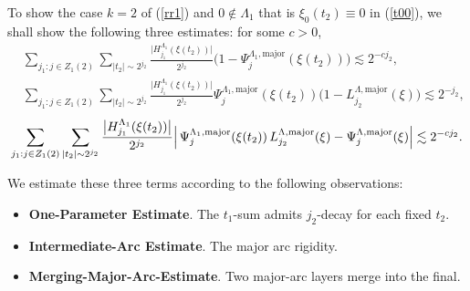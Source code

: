 \documentclass[10pt,a4paper]{amsart}
\numberwithin{equation}{section}
\begin{document}
 

To show the case $k=2$ of (\ref{rr1}) and $0\notin \Lambda_1$  that is $\xi_0(t_2)\equiv 0$ in (\ref{t00}), 
 we shall show  the following three estimates: for some $c>0$,
\begin{align}
&\sum_{j_1 : j \in Z_1(2)} 
  \sum_{|t_2|\sim 2^{j_2}}
  \frac{\bigl|H^{\Lambda_1}_{j_1}(\xi(t_2))\bigr|}{2^{j_2}}
  \bigl(1 - \Psi_{j}^{\Lambda_1,\mathrm{major}}(\xi(t_2))\bigr)\lesssim 2^{-c j_2}, 
  \label{283a} \\
&\sum_{j_1 : j \in Z_1(2)} 
  \sum_{|t_2|\sim 2^{j_2}}
  \frac{\bigl|H^{\Lambda_1}_{j_1}(\xi(t_2))\bigr|}{2^{j_2}}
  \Psi_{j}^{\Lambda_1,\mathrm{major}}\!\left(\xi(t_2)\right)
  \bigl(1 - L^{\Lambda,\mathrm{major}}_{j_2}(\xi)\bigr)\lesssim 2^{-j_2},\label{283b}
\end{align}
\begin{equation}
	\sum_{j_1 : j \in Z_1(2)} 
	\sum_{|t_2|\sim 2^{j_2}}
	\frac{\bigl|H^{\Lambda_1}_{j_1}(\xi(t_2))\bigr|}{2^{j_2}} 
	\Bigl|\,
	\Psi_j^{\Lambda_1,\mathrm{major}}\!\left(\xi(t_2)\right)
	L^{\Lambda,\mathrm{major}}_{j_2}(\xi)
	- \Psi_j^{\Lambda,\mathrm{major}}(\xi)
	\Bigr|\lesssim 2^{-cj_2}.\label{283c}
\end{equation}

 We estimate these three terms according to the following observations:
\begin{itemize}
\item[\eqref{283a}] \textbf{One-Parameter Estimate}. The $t_1$-sum admits $j_2$-decay  for each fixed $t_2$.
\item[\eqref{283b}] \textbf{Intermediate-Arc Estimate}. The major arc rigidity.
\item[\eqref{283c}] \textbf{Merging-Major-Arc-Estimate}. Two major-arc layers merge into the final.
\end{itemize}
\end{document}

